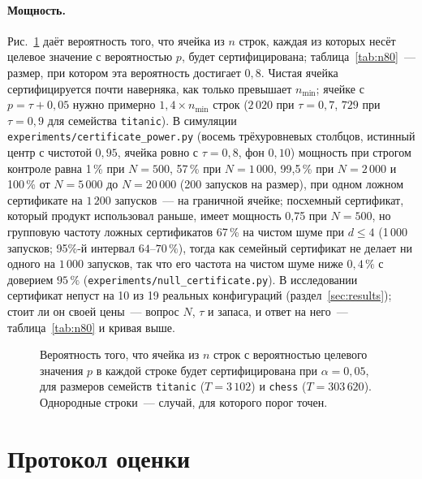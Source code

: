 \documentclass[11pt]{article}
\begin{document}
\paragraph{Мощность.} Рис.~\ref{fig:power} даёт вероятность того, что ячейка из $n$ строк, каждая из которых несёт целевое значение с вероятностью $p$, будет сертифицирована; таблица~\ref{tab:n80}~--- размер, при котором эта вероятность достигает $0{,}8$. Чистая ячейка сертифицируется почти наверняка, как только превышает $n_{\min}$; ячейке с $p=\tau+0{,}05$ нужно примерно $1{,}4\times n_{\min}$ строк ($2\,020$ при $\tau=0{,}7$, $729$ при $\tau=0{,}9$ для семейства \texttt{titanic}). В симуляции \texttt{experiments/certificate\_power.py} (восемь трёхуровневых столбцов, истинный центр с чистотой $0{,}95$, ячейка ровно с $\tau=0{,}8$, фон $0{,}10$) мощность при строгом контроле равна 1\,\% при $N=500$, 57\,\% при $N=1\,000$, 99,5\,\% при $N=2\,000$ и 100\,\% от $N=5\,000$ до $N=20\,000$ (200 запусков на размер), при одном ложном сертификате на $1\,200$ запусков~--- на граничной ячейке; посхемный сертификат, который продукт использовал раньше, имеет мощность 0,75 при $N=500$, но групповую частоту ложных сертификатов 67\,\% на чистом шуме при $d\le4$ (1\,000 запусков; 95\%-й интервал $64$--$70\,\%$), тогда как семейный сертификат не делает ни одного на $1\,000$ запусков, так что его частота на чистом шуме ниже $0{,}4\,\%$ с доверием $95\,\%$ (\texttt{experiments/null\_certificate.py}). В исследовании сертификат непуст на 10 из 19 реальных конфигураций (раздел~\ref{sec:results}); стоит ли он своей цены~--- вопрос $N$, $\tau$ и запаса, и ответ на него~--- таблица~\ref{tab:n80} и кривая выше.

\begin{figure}[t]\centering

\caption{Вероятность того, что ячейка из $n$ строк с вероятностью целевого значения $p$ в каждой строке будет сертифицирована при $\alpha=0{,}05$, для размеров семейств \texttt{titanic} ($T=3\,102$) и \texttt{chess} ($T=303\,620$). Однородные строки~--- случай, для которого порог точен.}\label{fig:power}
\end{figure}

\begin{table}[t]\centering\small
\caption{$n_{80}$: размер ячейки, при котором вероятность сертификации достигает $0{,}8$, рядом с $n_{\min}$ (таблица~\ref{tab:nmin}).}\label{tab:n80}

\end{table}

\section{Протокол оценки}\label{sec:protocol}
\end{document}
